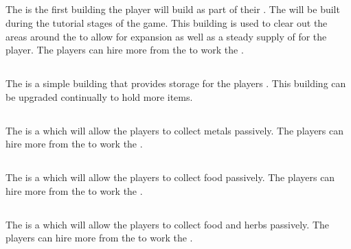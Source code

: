\subsection{}

The  is the first building the player will build as part of their . The  will be built during the tutorial stages of the game. This building is used to clear out the areas around the  to allow for expansion as well as a steady supply of  for the player. The players can hire more  from the  to work the .

\subsection{}

The  is a simple building that provides storage for the players . This building can be upgraded continually to hold more items.

\subsection{}

The  is a  which will allow the players to collect metals passively. The players can hire more  from the  to work the .

\subsection{}

The  is a  which will allow the players to collect food passively. The players can hire more  from the  to work the .

\subsection{}

The  is a  which will allow the players to collect food and herbs passively. The players can hire more  from the  to work the .

\subsection{}


